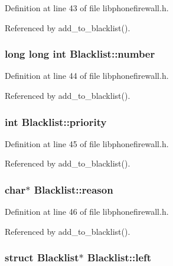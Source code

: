 Definition at line 43 of file libphonefirewall.h.

Referenced by add\_\-to\_\-blacklist().\hypertarget{structBlacklist_f49a3f50339083daf291a6237c9a9bef}{
\subsubsection{\setlength{\rightskip}{0pt plus 5cm}long long int {\bf Blacklist::number}}}
\label{structBlacklist_f49a3f50339083daf291a6237c9a9bef}




Definition at line 44 of file libphonefirewall.h.

Referenced by add\_\-to\_\-blacklist().\hypertarget{structBlacklist_a5370eb6240b6e528ce56fb10d7e9249}{
\subsubsection{\setlength{\rightskip}{0pt plus 5cm}int {\bf Blacklist::priority}}}
\label{structBlacklist_a5370eb6240b6e528ce56fb10d7e9249}




Definition at line 45 of file libphonefirewall.h.

Referenced by add\_\-to\_\-blacklist().\hypertarget{structBlacklist_4aaebfcc863267f326258e0622bf7303}{
\subsubsection{\setlength{\rightskip}{0pt plus 5cm}char$\ast$ {\bf Blacklist::reason}}}
\label{structBlacklist_4aaebfcc863267f326258e0622bf7303}




Definition at line 46 of file libphonefirewall.h.

Referenced by add\_\-to\_\-blacklist().\hypertarget{structBlacklist_0be77041c99c30786d7aa28d6612d90f}{
\subsubsection{\setlength{\rightskip}{0pt plus 5cm}struct {\bf Blacklist}$\ast$ {\bf Blacklist::left}}}
\label{structBlacklist_0be77041c99c30786d7aa28d6612d90f}




